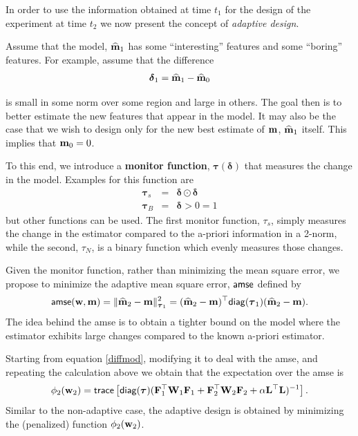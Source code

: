 \documentclass[11pt]{article}
\newcommand{\bfF}	{{\bf{F}}}
\newcommand{\bfL}	{{\bf{L}}}
\newcommand{\bfW}	{{\bf{W}}}
\newcommand{\bfm}	{{\bf{m}}}
\newcommand{\bfw}	{{\bf{w}}}
\newcommand{\bftau}      {{\boldsymbol \tau}}
\newcommand{\bfdelta}	 { { \boldsymbol \delta} }
\newcommand{\LtL}       { \bfL^{\top}\bfL}
\newcommand{\bfmhat}    {{\widehat{\bfm}}}
\begin{document}
In order to use the information obtained at time $t_{1}$ for the design of the experiment at time $t_{2}$
 we now present the concept of {\em adaptive design}.

 Assume that the model, $\bfmhat_{1}$ has some ``interesting'' features and some ``boring'' features.
For example, assume that the difference
\begin{eqnarray*}
\label{diff}
 \bfdelta_{1} = \bfmhat_{1} - \bfmhat_{0}
\end{eqnarray*}


is small in some norm over some region and large in others. The goal then is to better estimate the new features
that appear in the model. It may also be the case that we wish to design only for the new best estimate of $\bfm$, $\bfmhat_1$ itself. This implies that $\bfm_0=0$. 

To this end, we introduce a {\bf monitor function}, $\bftau(\bfdelta)$ that measures
the change in the model. 
Examples for this function are
\begin{subequations}
\label{taufuns}
\begin{eqnarray*}
\bftau_{s} &=& \bfdelta \odot \bfdelta \\
\bftau_{B} &=&  \bfdelta  > 0 = 1
\end{eqnarray*}
\end{subequations}
but other functions can be used. The first monitor  function, $\tau_{s}$, simply measures the change in the estimator
compared to the a-priori information in a 2-norm, while the second, $\tau_{N}$, is a binary function which evenly measures those changes. 

Given the monitor function,
rather than minimizing the mean square error, we propose to minimize the
adaptive mean square error, ${\sf amse}$ defined by
\begin{eqnarray}
\label{amse}
{\sf amse}(\bfw,\bfm) = \| \bfmhat_2 -\bfm \|_{\bftau_1}^{2} = 
 (\bfmhat_2 -\bfm)^{\top}{\sf diag}(\bftau_1)(\bfmhat_2 -\bfm).
 \end{eqnarray}
The idea behind the {\sf amse} is to obtain a tighter bound on the model where the estimator exhibits large changes
compared to the known a-priori estimator. 

Starting from  equation \eqref{diffmod}, modifying it to deal with the {\sf amse}, and repeating the calculation above we obtain that the expectation 
over the {\sf amse} is
\begin{eqnarray}
\label{design2ad}
\phi_{2}(\bfw_{2}) =  {\sf trace} \left[  {\sf diag}(\bftau) (\bfF_{1}^{\top}\bfW_{1}\bfF_{1}   + \bfF_{2}^{\top}\bfW_{2}\bfF_{2} +
\alpha \LtL)^{-1} \right]. 
\end{eqnarray}
Similar to the non-adaptive case, the adaptive design is obtained by minimizing the (penalized) 
function $\phi_{2}(\bfw_{2})$.
\end{document}

